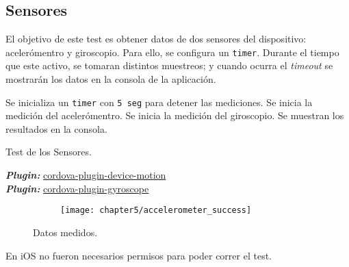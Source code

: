 \subsection{Sensores}
El objetivo de este test es obtener datos de dos sensores del dispositivo: acelerómentro y giroscopio. Para ello, se configura un \texttt{timer}. Durante el tiempo que este activo, se tomaran distintos muestreos; y cuando ocurra el \emph{timeout} se mostrarán los datos en la consola de la aplicación.\\
\begin{algorithm}
	\begin{algorithmic}[1]
		\STATE Se inicializa un \texttt{timer} con \texttt{5 seg} para detener las mediciones.
		\STATE Se inicia la medición del acelerómentro.
		\STATE Se inicia la medición del giroscopio.
		\STATE Se muestran los resultados en la consola.
	\end{algorithmic}
	\caption{Test de los Sensores.}\label{alg:chap5_test_sensors}
\end{algorithm}
\textbf{\emph{Plugin:}} \href{https://www.npmjs.com/package/cordova-plugin-device-motion}{cordova-plugin-device-motion}\\
\textbf{\emph{Plugin:}} \href{https://www.npmjs.com/package/cordova-plugin-gyroscope}{cordova-plugin-gyroscope}\\
\begin{figure}[hbtp]
    \centering
	\begin{subfigure}{.3\linewidth}
	    \centering
		\texttt{[image: chapter5/accelerometer\_success]}
		\label{fig:ch05:accelerometer_success}
	\end{subfigure}
	\caption{Datos medidos.}
	\label{fig:chapter05:sensors_test}
\end{figure}
En iOS no fueron necesarios permisos para poder correr el test.
\newpage
